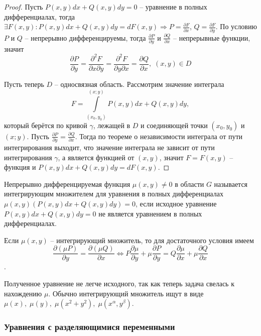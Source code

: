     \begin{proof}
        Пусть $P(x, y)dx + Q(x, y)dy = 0$ -- уравнение в полных дифференциалах, тогда $\exists F(x, y): P(x, y)dx + Q(x, y)dy = dF(x, y) \Rightarrow P = \frac{\partial F}{\partial x}$, $Q = \frac{\partial F}{\partial y}$. По условию $P$ и $Q$ -- непрерывно дифференцируемы, тогда $\frac{\partial P}{\partial y}$ и $\frac{\partial Q}{\partial x}$ -- непрерывные функции, значит 
        \begin{equation*}
            \frac{\partial P}{\partial y} = \frac{\partial^2 F}{\partial x \partial y} = \frac{\partial^2 F}{\partial y \partial x} = \frac{\partial Q}{\partial x}, \; (x, y) \in D
        \end{equation*}

        Пусть теперь $D$ -- односвязная область. Рассмотрим значение интеграла
        \[ F = \int\limits^{(x; y)}_{(x_0, y_0)} P(x, y) dx + Q(x, y) dy, \]
        который берётся по кривой $\gamma$, лежащей в $D$ и соединяющей точки $(x_0, y_0)$ и $(x; y)$. Пусть $\frac{\partial P}{\partial y} = \frac{\partial Q}{\partial x}$. Тогда по теореме о независимости интеграла от пути интегрирования выходит, что значение интеграла не зависит от пути интегрирования $\gamma$, а является функцией от $(x, y)$, значит $F = F(x, y)$ -- функция и $P(x, y)dx + Q(x, y)dy = dF(x, y)$.
    \end{proof}

    \begin{definition}
        Непрерывно дифференцируемая функция $\mu(x, y) \neq 0$ в области $G$ называется интегрирующим множителем для уравнения в полных дифференциалах \\$\mu(x, y) (P(x, y) dx + Q(x, y) dy) = 0$, если исходное уравнение $P(x, y) dx + Q(x, y) dy = 0$ не является уравнением в полных дифференциалах.
    \end{definition}

    Если $\mu(x, y)$ -- интегрирующий множитель, то для достаточного условия имеем
    \[\frac{\partial (\mu P)}{\partial y} = \frac{\partial (\mu Q)}{\partial x} \Leftrightarrow P \frac{\partial \mu}{\partial y} + \mu \frac{\partial P}{\partial y} = Q \frac{\partial \mu}{\partial x} + \mu \frac{\partial Q}{\partial x}\].

    Полученное уравнение не легче исходного, так как теперь задача свелась к нахождению $\mu$. Обычно интегрирующий множитель ищут в виде $\mu(x), \; \mu(y), \; \mu(x^2 + y^2), \; \mu (x^{\alpha}, y^ {\beta})$.

    \subsubsection{Уравнения с разделяющимися переменными}

